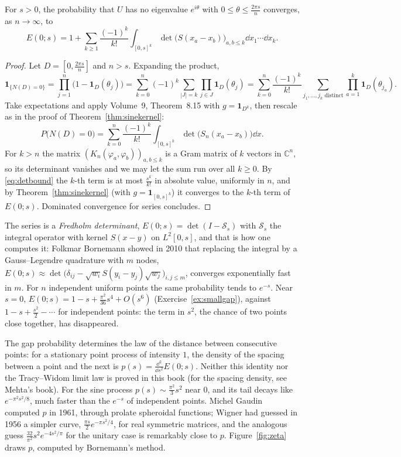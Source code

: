 \begin{theorem}\label{thm:gap}
For $s>0$, the probability that $U$ has no eigenvalue $e^{i\theta}$ with $0\le\theta\le\frac{2\pi s}n$ converges, as $n\to\infty$, to
\[
E(0;s)=1+\sum_{k\ge1}\frac{(-1)^k}{k!}\int_{[0,s]^k}\det\bigl(S(x_a-x_b)\bigr)_{a,b\le k}\dd x_1\cdots\dd x_k.
\]
\end{theorem}

\begin{proof}
Let $D=[0,\frac{2\pi s}n]$ and $n>s$. Expanding the product,
\[
\mathbf 1_{\{N(D)=0\}}=\prod_{j=1}^n\bigl(1-\mathbf 1_D(\theta_j)\bigr)=\sum_{k=0}^n(-1)^k\!\!\sum_{|J|=k}\prod_{j\in J}\mathbf 1_D(\theta_j)=\sum_{k=0}^n\frac{(-1)^k}{k!}\sum_{j_1,\dots,j_k\text{ distinct}}\prod_{a=1}^k\mathbf 1_D(\theta_{j_a}).
\]
Take expectations and apply Volume~9, Theorem~8.15 with $g=\mathbf 1_{D^k}$, then rescale as in the proof of Theorem~\ref{thm:sinekernel}:
\[
P\bigl(N(D)=0\bigr)=\sum_{k=0}^n\frac{(-1)^k}{k!}\int_{[0,s]^k}\det\bigl(S_n(x_a-x_b)\bigr)\dd x.
\]
For $k>n$ the matrix $(K_n(\varphi_a,\varphi_b))_{a,b\le k}$ is a Gram matrix of $k$ vectors in $\mathbb C^n$, so its determinant vanishes and we may let the sum run over all $k\ge0$. By \eqref{eq:detbound} the $k$-th term is at most $\frac{s^k}{k!}$ in
absolute value, uniformly in $n$, and by Theorem~\ref{thm:sinekernel} (with $g=\mathbf 1_{[0,s]^k}$) it converges to the $k$-th term of $E(0;s)$. Dominated convergence for series concludes.
\end{proof}

The series is a \emph{Fredholm determinant}, $E(0;s)=\det(I-\mathcal S_s)$ with $\mathcal S_s$ the integral operator with kernel $S(x-y)$ on $L^2[0,s]$, and that is how one computes it: Folkmar Bornemann showed in 2010 that replacing the integral
by a Gauss--Legendre quadrature with $m$ nodes, $E(0;s)\approx\det\bigl(\delta_{ij}-\sqrt{w_i}S(y_i-y_j)\sqrt{w_j}\bigr)_{i,j\le m}$, converges exponentially fast in $m$. For $n$ independent uniform points the same probability tends to $e^{-s}$.
Near $s=0$, $E(0;s)=1-s+\frac{\pi^2}{36}s^4+O(s^6)$ (Exercise~\ref{ex:smallgap}), against $1-s+\frac{s^2}2-\cdots$ for independent points: the term in $s^2$, the chance of two points close together, has disappeared.

\begin{remark}[spacings]
The gap probability determines the law of the distance between consecutive points: for a stationary point process of intensity $1$, the density of the spacing between a point and the next is $p(s)=\frac{\dd^2}{\dd s^2}E(0;s)$. Neither this identity nor the Tracy--Widom limit law is proved in this book (for the spacing density, see Mehta's book). For the sine process $p(s)\sim\frac{\pi^2}3s^2$ near $0$, and its tail decays like $e^{-\pi^2s^2/8}$, much faster than the $e^{-s}$ of independent points. Michel Gaudin computed $p$ in 1961, through
prolate spheroidal functions; Wigner had guessed in 1956 a simpler curve, $\frac{\pi s}2e^{-\pi s^2/4}$, for real symmetric matrices, and the analogous guess $\frac{32}{\pi^2}s^2e^{-4s^2/\pi}$ for the unitary case is remarkably close to $p$.
Figure~\ref{fig:zeta} draws $p$, computed by Bornemann's method.
\end{remark}

